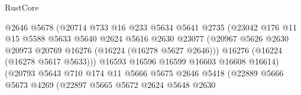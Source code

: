 \begin{lexlean}{RustCore}
\begin{coremodule}
                                      @2646
                                      @5678
                                      (@20714
                                        @733
                                        @16
                                        @233
                                        @5634
                                        @5641
                                        @2735
                                        (@23042
                                          @176
                                          @11
                                          @15
                                          @5588
                                          @5633
                                          @5640
                                          @2624
                                          @5616
                                          @2630
                                          @23077
                                          (@20967
                                            @5626
                                            @2630
                                            @20973
                                            @20769
                                            @16276
                                            (@16224 (@16278 @5627 @2646)))
                                          @16276
                                          (@16224 (@16278 @5617 @5633)))
                                        @16593
                                        @16596
                                        @16599
                                        @16603
                                        @16608
                                        @16614)
                                      (@20793
                                        @5643
                                        @710
                                        @174
                                        @11
                                        @5666
                                        @5675
                                        @2646
                                        @5418
                                        (@22889
                                          @5666
                                          @5673
                                          @4269
                                          (@22897
                                            @5665
                                            @5672
                                            @2624
                                            @5648
                                            @2630

\end{coremodule}
\end{lexlean}
